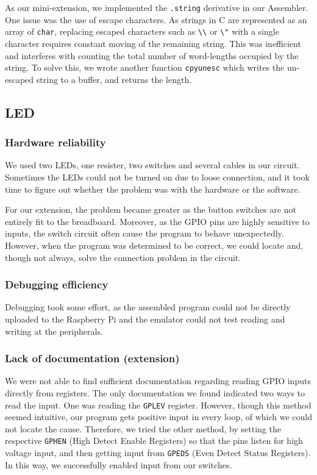 \documentclass[11pt]{article}
\begin{document}
As our mini-extension, we implemented the \texttt{.string} derivative in our Assembler. One issue was the use of escape characters. As strings in C are represented as an array of \texttt{char}, replacing escaped characters such as \texttt{\textbackslash\textbackslash} or \texttt{\textbackslash"} with a single character requires constant moving of the remaining string. This was inefficient and interferes with counting the total number of word-lengths occupied by the string. To solve this, we wrote another function \texttt{cpyunesc} which writes the un-escaped string to a buffer, and returns the length.

\subsection{LED}

\subsubsection{Hardware reliability}

We used two LEDs, one resister, two switches and several cables in our circuit. Sometimes the LEDs could not be turned on due to loose connection, and it took time to figure out whether the problem was with the hardware or the software.

For our extension, the problem became greater as the button switches are not entirely fit to the breadboard. Moreover, as the GPIO pins are highly sensitive to inputs, the switch circuit often cause the program to behave unexpectedly. However, when the program was determined to be correct, we could locate and, though not always, solve the connection problem in the circuit.

\subsubsection{Debugging efficiency}

Debugging took some effort, as the assembled program could not be directly uploaded to the Raspberry Pi and the emulator could not test reading and writing at the peripherals.

\subsubsection{Lack of documentation (extension)}

We were not able to find sufficient documentation regarding reading GPIO inputs directly from registers. The only documentation we found indicated two ways to read the input. One was reading the \texttt{GPLEV} register. However, though this method seemed intuitive, our program gets positive input in every loop, of which we could not locate the cause. Therefore, we tried the other method, by setting the respective \texttt{GPHEN} (High Detect Enable Registers) so that the pins listen for high voltage input, and then getting input from \texttt{GPEDS} (Even Detect Status Registers). In this way, we successfully enabled input from our switches.
\end{document}

